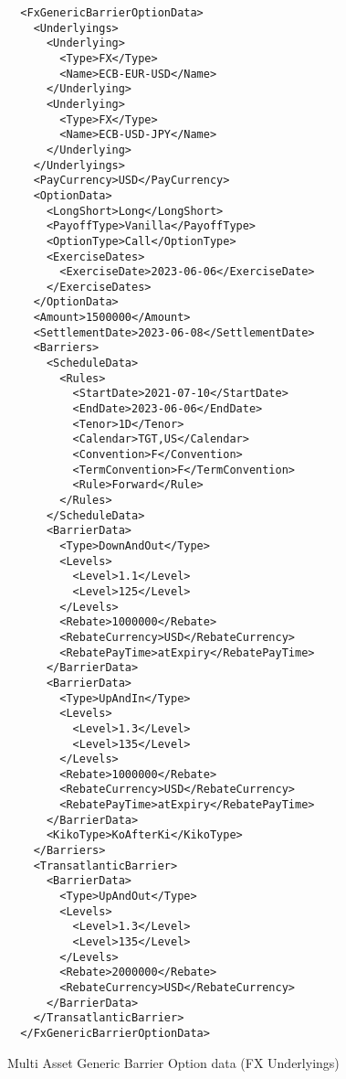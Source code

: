 \begin{listing}[H]
\begin{verbatim}
  <FxGenericBarrierOptionData>
    <Underlyings>
      <Underlying>
        <Type>FX</Type>
        <Name>ECB-EUR-USD</Name>
      </Underlying>
      <Underlying>
        <Type>FX</Type>
        <Name>ECB-USD-JPY</Name>
      </Underlying>
    </Underlyings>
    <PayCurrency>USD</PayCurrency>
    <OptionData>
      <LongShort>Long</LongShort>
      <PayoffType>Vanilla</PayoffType>
      <OptionType>Call</OptionType>
      <ExerciseDates>
        <ExerciseDate>2023-06-06</ExerciseDate>
      </ExerciseDates>
    </OptionData>
    <Amount>1500000</Amount>
    <SettlementDate>2023-06-08</SettlementDate>
    <Barriers>
      <ScheduleData>
        <Rules>
          <StartDate>2021-07-10</StartDate>
          <EndDate>2023-06-06</EndDate>
          <Tenor>1D</Tenor>
          <Calendar>TGT,US</Calendar>
          <Convention>F</Convention>
          <TermConvention>F</TermConvention>
          <Rule>Forward</Rule>
        </Rules>
      </ScheduleData>
      <BarrierData>
        <Type>DownAndOut</Type>
        <Levels>
          <Level>1.1</Level>
          <Level>125</Level>
        </Levels>
        <Rebate>1000000</Rebate>
        <RebateCurrency>USD</RebateCurrency>
        <RebatePayTime>atExpiry</RebatePayTime>
      </BarrierData>
      <BarrierData>
        <Type>UpAndIn</Type>
        <Levels>
          <Level>1.3</Level>
          <Level>135</Level>
        </Levels>
        <Rebate>1000000</Rebate>
        <RebateCurrency>USD</RebateCurrency>
        <RebatePayTime>atExpiry</RebatePayTime>
      </BarrierData>
      <KikoType>KoAfterKi</KikoType>
    </Barriers>
    <TransatlanticBarrier>
      <BarrierData>
        <Type>UpAndOut</Type>
        <Levels>
          <Level>1.3</Level>
          <Level>135</Level>
        </Levels>
        <Rebate>2000000</Rebate>
        <RebateCurrency>USD</RebateCurrency>
      </BarrierData>
    </TransatlanticBarrier>
  </FxGenericBarrierOptionData>
\end{verbatim}
\caption{Multi Asset Generic Barrier Option data (FX Underlyings)}
\label{lst:multiasset_generic_barrieroption_data}
\end{listing}
